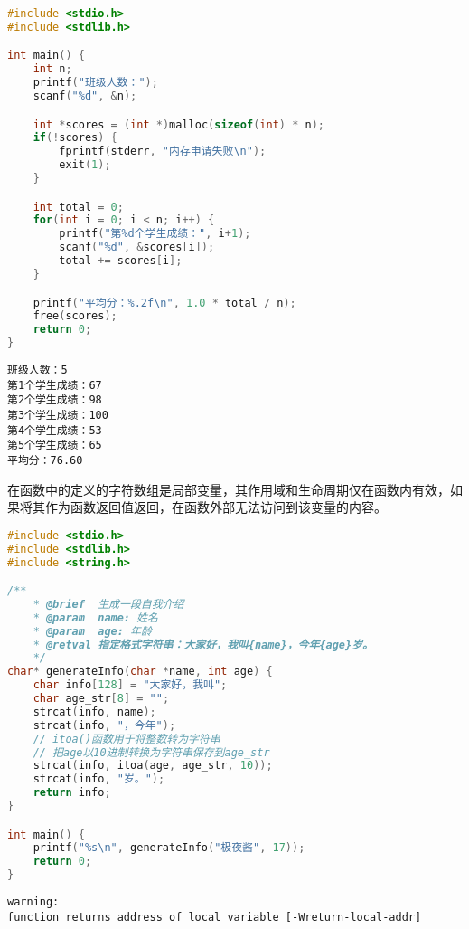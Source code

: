 \vspace{0.5cm}


\begin{lstlisting}[language=C]
#include <stdio.h>
#include <stdlib.h>

int main() {
    int n;
    printf("班级人数：");
    scanf("%d", &n);

    int *scores = (int *)malloc(sizeof(int) * n);
    if(!scores) {
        fprintf(stderr, "内存申请失败\n");
        exit(1);
    }

    int total = 0;
    for(int i = 0; i < n; i++) {
        printf("第%d个学生成绩：", i+1);
        scanf("%d", &scores[i]);
        total += scores[i];
    }

    printf("平均分：%.2f\n", 1.0 * total / n);
    free(scores);
    return 0;
}
\end{lstlisting}

\begin{tcolorbox}
    \begin{verbatim}
班级人数：5
第1个学生成绩：67
第2个学生成绩：98
第3个学生成绩：100
第4个学生成绩：53
第5个学生成绩：65
平均分：76.60
	\end{verbatim}
\end{tcolorbox}

在函数中的定义的字符数组是局部变量，其作用域和生命周期仅在函数内有效，如果将其作为函数返回值返回，在函数外部无法访问到该变量的内容。\\


\begin{lstlisting}[language=C]
#include <stdio.h>
#include <stdlib.h>
#include <string.h>

/**
    * @brief  生成一段自我介绍
    * @param  name: 姓名
    * @param  age: 年龄
    * @retval 指定格式字符串：大家好，我叫{name}，今年{age}岁。
    */
char* generateInfo(char *name, int age) {
    char info[128] = "大家好，我叫";
    char age_str[8] = "";
    strcat(info, name);
    strcat(info, "，今年");
    // itoa()函数用于将整数转为字符串
    // 把age以10进制转换为字符串保存到age_str
    strcat(info, itoa(age, age_str, 10));
    strcat(info, "岁。");
    return info;
}

int main() {
    printf("%s\n", generateInfo("极夜酱", 17));
    return 0;
}
\end{lstlisting}

\begin{tcolorbox}
    \begin{verbatim}
warning:
function returns address of local variable [-Wreturn-local-addr]
	\end{verbatim}
\end{tcolorbox}

